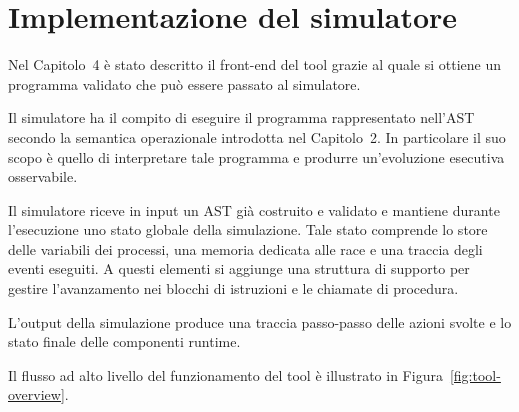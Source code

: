 \chapter{Implementazione del simulatore}

Nel Capitolo~4 è stato descritto il front-end del tool grazie al quale si ottiene un programma validato che può essere passato al simulatore.

Il simulatore ha il compito di eseguire il programma rappresentato nell’AST secondo la semantica operazionale introdotta nel Capitolo~2. In particolare il suo scopo è quello di interpretare tale programma e produrre un’evoluzione esecutiva osservabile.

Il simulatore riceve in input un AST già costruito e validato e mantiene durante l’esecuzione uno stato globale della simulazione. Tale stato comprende lo store delle variabili dei processi, una memoria dedicata alle race e una traccia degli eventi eseguiti. A questi elementi si aggiunge una struttura di supporto per gestire l’avanzamento nei blocchi di istruzioni e le chiamate di procedura.

L’output della simulazione produce una traccia passo-passo delle azioni svolte e lo stato finale delle componenti runtime.

Il flusso ad alto livello del funzionamento del tool è illustrato in Figura~\ref{fig:tool-overview}.

